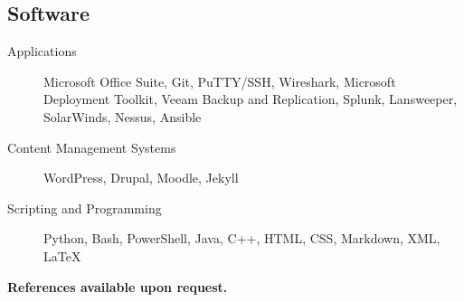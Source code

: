 \documentclass{article}
\begin{document}
\begin{samepage}
\subsection{Software}

\begin{description}
\item[Applications] Microsoft Office Suite, Git, PuTTY/SSH, Wireshark, Microsoft Deployment Toolkit, Veeam Backup and Replication, Splunk, Lansweeper, SolarWinds, Nessus, Ansible
\item[Content Management Systems] WordPress, Drupal, Moodle, Jekyll
\item[Scripting and Programming] Python, Bash, PowerShell, Java, C++, HTML, CSS, Markdown, XML, {\LaTeX}
\end{description}


\begin{center}
\textbf{References available upon request.}
\end{center}

\thispagestyle{empty}
\end{samepage}
\end{document}
